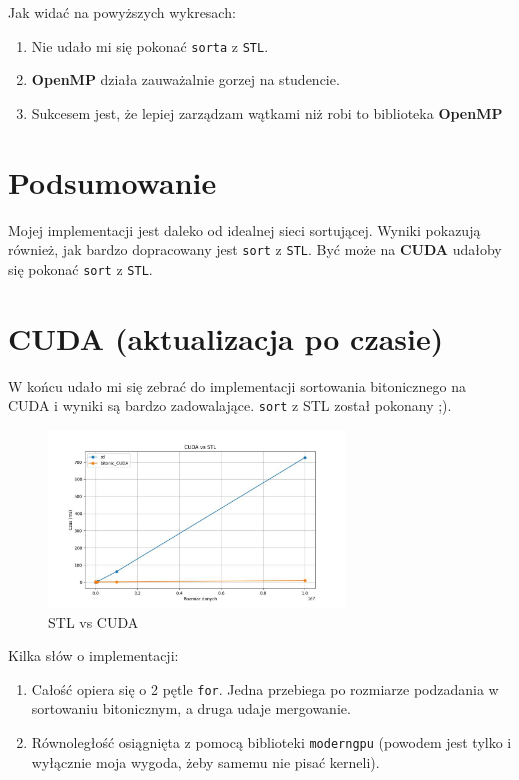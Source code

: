 \documentclass{article}
\begin{document}
Jak widać na powyższych wykresach:
\begin{enumerate}
\item Nie udało mi się pokonać \texttt{sorta} z \texttt{STL}.
\item \textbf{OpenMP} działa zauważalnie gorzej na studencie.
\item Sukcesem jest, że lepiej zarządzam wątkami niż robi to biblioteka \textbf{OpenMP}
\end{enumerate}

\section*{Podsumowanie}
Mojej implementacji jest daleko od idealnej sieci sortującej. Wyniki pokazują również, jak bardzo dopracowany jest \texttt{sort} z \texttt{STL}. Być może na \textbf{CUDA} udałoby się pokonać \texttt{sort} z \texttt{STL}.

\newpage

\section*{CUDA (aktualizacja po czasie)}
W końcu udało mi się zebrać do implementacji sortowania bitonicznego na CUDA i wyniki są bardzo zadowalające. \texttt{sort} z STL został pokonany ;).

\begin{figure}[htp]
    \centering
    \includegraphics[width=0.7\textwidth]{stlVsCUDA.jpg}
    \caption{STL vs CUDA}
\end{figure}

Kilka słów o implementacji:
\begin{enumerate}
    \item Całość opiera się o 2 pętle \texttt{for}. Jedna przebiega po rozmiarze podzadania w sortowaniu bitonicznym, a druga udaje mergowanie.
    \item Równoległość osiągnięta z pomocą biblioteki \texttt{moderngpu} (powodem jest tylko i wyłącznie moja wygoda, żeby samemu nie pisać kerneli). 
\end{enumerate}
\end{document}
